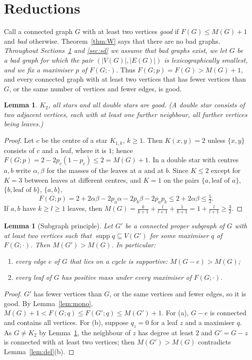 \documentclass[11pt,a4paper]{article}
\newtheorem{lemma}[theorem]{Lemma}
\theoremstyle{definition}
\theoremstyle{remark}
\numberwithin{equation}{section}
\newcommand{\supp}{\operatorname{supp}}
\begin{document}
\section{Reductions}\label{sec:red}

Call a connected graph $G$ with at least two vertices \emph{good} if
$F(G)\le M(G)+1$ and \emph{bad} otherwise. Theorem~\ref{thm:W} says that there are
no bad graphs. \emph{Throughout Sections~\ref{sec:red} and \ref{sec:sd} we assume
that bad graphs exist, we let $G$ be a bad graph for which the pair
$(|V(G)|,|E(G)|)$ is lexicographically smallest, and we fix a maximiser $p$ of
$F(G;\cdot)$.} Thus $F(G;p)=F(G)>M(G)+1$, and every connected graph with at least
two vertices that has fewer vertices than $G$, or the same number of vertices and
fewer edges, is good.

\begin{lemma}\label{lem:base}
$K_2$, all stars and all double stars are good. (A double star consists of two
adjacent vertices, each with at least one further neighbour, all further vertices
being leaves.)
\end{lemma}
\begin{proof}
Let $c$ be the centre of a star $K_{1,k}$, $k\ge1$. Then $K(x,y)=2$ unless
$\{x,y\}$ consists of $c$ and a leaf, where it is $1$; hence
$F(G;p)=2-2p_c(1-p_c)\le2=M(G)+1$. In a double star with centres $a,b$ write
$\alpha,\beta$ for the masses of the leaves at $a$ and at $b$. Since $K\le2$
except for $K=3$ between leaves at different centres, and $K=1$ on the pairs
$\{a,\text{leaf of }a\}$, $\{b,\text{leaf of }b\}$, $\{a,b\}$,
\[
 F(G;p)=2+2\alpha\beta-2p_a\alpha-2p_b\beta-2p_ap_b\le2+2\alpha\beta\le\tfrac52 .
\]
If $a,b$ have $k\ge l\ge1$ leaves, then $M(G)=\frac{k}{k+1}+\frac{l}{l+1}+\frac1{k+1}
=1+\frac l{l+1}\ge\frac32$.
\end{proof}

\begin{lemma}[Subgraph principle]\label{lem:sub}
Let $G'$ be a connected proper subgraph of $G$ with at least two vertices such that
$\supp q\subseteq V(G')$ for some maximiser $q$ of $F(G;\cdot)$. Then
$M(G')>M(G)$. In particular:
\begin{enumerate}[label=(\alph*)]
\item every edge $e$ of $G$ that lies on a cycle is \emph{supportive}:
$M(G-e)>M(G)$;
\item every leaf of $G$ has positive mass under every maximiser of $F(G;\cdot)$.
\end{enumerate}
\end{lemma}
\begin{proof}
$G'$ has fewer vertices than $G$, or the same vertices and fewer edges, so it is
good. By Lemma~\ref{lem:mono}, $M(G)+1<F(G;q)\le F(G';q)\le M(G')+1$. For (a),
$G-e$ is connected and contains all vertices. For (b), suppose $q_z=0$ for a leaf $z$ and a
maximiser $q$. As $G\ne K_2$ by Lemma~\ref{lem:base}, the neighbour of $z$ has degree
at least $2$ and $G'=G-z$ is connected with at least two vertices; then
$M(G')>M(G)$ contradicts Lemma~\ref{lem:del}(b).
\end{proof}
\end{document}
